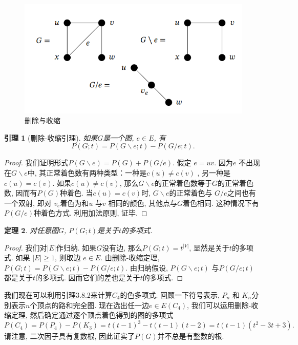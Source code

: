 \documentclass[a4paper,12pt]{ctexbook}
\newtheorem{lemma}{\hspace{2em}引理}[section]%
\newtheorem{theorem}[lemma]{\hspace{2em}定理}%
\begin{document}
\begin{figure}[h]
	\centering
	\includegraphics[width=0.8\linewidth]{./fig3/3-3.png}
	\caption{\label{chapter} 删除与收缩}
\end{figure}

\begin{lemma}[删除-收缩引理]
	如果$G$是一个图, $e \in E$, 有
	$$
	P(G ; t)=P(G \backslash e ; t)-P(G / e ; t).
	$$
\end{lemma}

\begin{proof}
我们证明形式$P(G \backslash e)=P(G)+P(G / e)$. 假定	 $e=u v$. 因为$e$ 不出现在$G \backslash e$中, 其正常着色数有两种类型：一种是$c(u) \neq c(v)$ , 另一种是 $c(u)=c(v)$. 如果$c(u) \neq c(v)$,  那么$G \backslash e$的正常着色数等于$G$的正常着色数, 因而有$P(G)$种着色. 当$c(u)=c(v)$时, $G \backslash e$的正常着色与 $G / e$之间也有一个双射, 即对 $v_{e}$着色为和$u$ 与$v$ 相同的颜色, 其他点与$G$着色相同. 这种情况下有$P(G / e)$种着色方式. 利用加法原则, 证毕.
\end{proof}

\begin{theorem}
	对任意图$G$, $P(G ; t)$是关于$t$的多项式.
\end{theorem}

\begin{proof}
	我们对$ |E|$作归纳. 如果$G$没有边, 那么$P(G ; t)=t^{| V|}$, 显然是关于$t$的多项式. 如果 $|E| \geq 1$, 则取边 $e \in E$. 由删除-收缩定理, $P(G ; t)=P(G \backslash e ; t)-P(G / e ; t)$. 由归纳假设,  $P(G \backslash e ; t)$ 与$P(G / e ; t)$ 都是关于$t$的多项式. 因而它们的差也是关于$t$的多项式.
\end{proof}

我们现在可以利用引理3.8.2来计算$C_{4}$的色多项式. 回顾一下符号表示, $P_{n}$ 和 $K_{n}$分别表示$n$个顶点的路和完全图. 现在选出任一边$e \in E\left(C_{4}\right)$, 我们可以运用删除-收缩定理, 然后确定通过逐个顶点着色得到的图的多项式
$$
P\left(C_{4}\right)=P\left(P_{4}\right)-P\left(K_{3}\right)=t(t-1)^{3}-t(t-1)(t-2)=t(t-1)\left(t^{2}-3 t+3\right) .
$$
请注意, 二次因子具有复数根, 因此证实了$P(G)$并不总是有整数的根.
\end{document}
